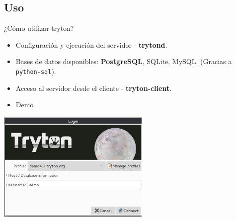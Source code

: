     \subsection{Uso}

	\begin{frame}[fragile=singleslide]{¿Cómo utilizar tryton?}
        \begin{itemize}
            \item Configuración y ejecución del servidor - {\color{ChetwodeBlue}\textbf{trytond}}.
            \item Bases de datos disponibles: \textbf{PostgreSQL}, SQLite, MySQL. (Gracias a \texttt{python-sql}).
            \item Acceso al servidor desde el cliente - {\color{ChetwodeBlue}\textbf{tryton-client}}.
            \item Demo
        \end{itemize}
        \begin{center}
            \includegraphics[width=0.55\textwidth]{./Images/demo.png}
        \end{center}
	\end{frame}

